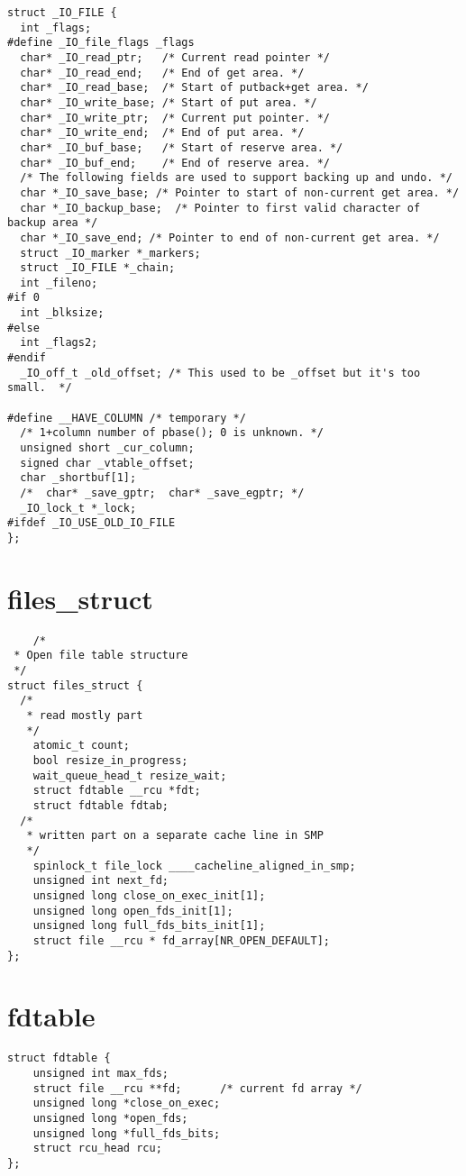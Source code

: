 \begin{lstlisting}
struct _IO_FILE {
  int _flags;
#define _IO_file_flags _flags
  char* _IO_read_ptr;	/* Current read pointer */
  char* _IO_read_end;	/* End of get area. */
  char* _IO_read_base;	/* Start of putback+get area. */
  char* _IO_write_base;	/* Start of put area. */
  char* _IO_write_ptr;	/* Current put pointer. */
  char* _IO_write_end;	/* End of put area. */
  char* _IO_buf_base;	/* Start of reserve area. */
  char* _IO_buf_end;	/* End of reserve area. */
  /* The following fields are used to support backing up and undo. */
  char *_IO_save_base; /* Pointer to start of non-current get area. */
  char *_IO_backup_base;  /* Pointer to first valid character of backup area */
  char *_IO_save_end; /* Pointer to end of non-current get area. */
  struct _IO_marker *_markers;
  struct _IO_FILE *_chain;
  int _fileno;
#if 0
  int _blksize;
#else
  int _flags2;
#endif
  _IO_off_t _old_offset; /* This used to be _offset but it's too small.  */

#define __HAVE_COLUMN /* temporary */
  /* 1+column number of pbase(); 0 is unknown. */
  unsigned short _cur_column;
  signed char _vtable_offset;
  char _shortbuf[1];
  /*  char* _save_gptr;  char* _save_egptr; */
  _IO_lock_t *_lock;
#ifdef _IO_USE_OLD_IO_FILE
};
\end{lstlisting}

\section{files\_struct}

\begin{lstlisting}
	/*
 * Open file table structure
 */
struct files_struct {
  /*
   * read mostly part
   */
	atomic_t count;
	bool resize_in_progress;
	wait_queue_head_t resize_wait;
	struct fdtable __rcu *fdt;
	struct fdtable fdtab;
  /*
   * written part on a separate cache line in SMP
   */
	spinlock_t file_lock ____cacheline_aligned_in_smp;
	unsigned int next_fd;
	unsigned long close_on_exec_init[1];
	unsigned long open_fds_init[1];
	unsigned long full_fds_bits_init[1];
	struct file __rcu * fd_array[NR_OPEN_DEFAULT];
};
\end{lstlisting}

\section{fdtable}

\begin{lstlisting}
struct fdtable {
	unsigned int max_fds;
	struct file __rcu **fd;      /* current fd array */
	unsigned long *close_on_exec;
	unsigned long *open_fds;
	unsigned long *full_fds_bits;
	struct rcu_head rcu;
};
\end{lstlisting}


